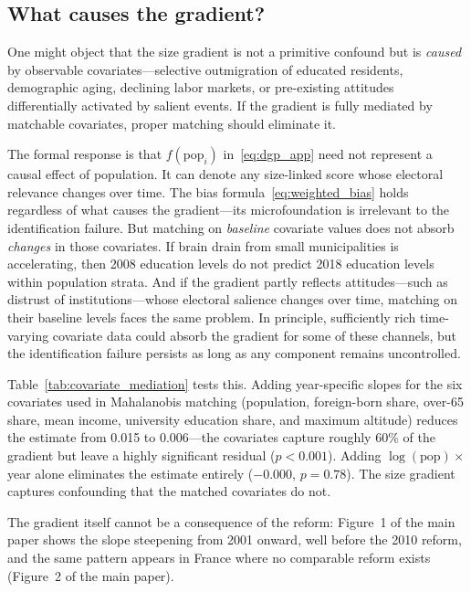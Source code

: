 \documentclass[12pt,letterpaper]{article}
\begin{document}
\subsection{What causes the gradient?}
\label{si:mediation}

One might object that the size gradient is not a primitive confound but is \textit{caused} by observable covariates---selective outmigration of educated residents, demographic aging, declining labor markets, or pre-existing attitudes differentially activated by salient events. If the gradient is fully mediated by matchable covariates, proper matching should eliminate it.

The formal response is that $f(\text{pop}_i)$ in~\eqref{eq:dgp_app} need not represent a causal effect of population. It can denote any size-linked score whose electoral relevance changes over time. The bias formula~\eqref{eq:weighted_bias} holds regardless of what causes the gradient---its microfoundation is irrelevant to the identification failure. But matching on \textit{baseline} covariate values does not absorb \textit{changes} in those covariates. If brain drain from small municipalities is accelerating, then 2008 education levels do not predict 2018 education levels within population strata. And if the gradient partly reflects attitudes---such as distrust of institutions---whose electoral salience changes over time, matching on their baseline levels faces the same problem. In principle, sufficiently rich time-varying covariate data could absorb the gradient for some of these channels, but the identification failure persists as long as any component remains uncontrolled.

Table~\ref{tab:covariate_mediation} tests this. Adding year-specific slopes for the six covariates used in Mahalanobis matching (population, foreign-born share, over-65 share, mean income, university education share, and maximum altitude) reduces the estimate from 0.015 to 0.006---the covariates capture roughly 60\% of the gradient but leave a highly significant residual ($p < 0.001$). Adding $\log(\text{pop}) \times$ year alone eliminates the estimate entirely ($-$0.000, $p = 0.78$). The size gradient captures confounding that the matched covariates do not.



The gradient itself cannot be a consequence of the reform: Figure~1 of the main paper shows the slope steepening from 2001 onward, well before the 2010 reform, and the same pattern appears in France where no comparable reform exists (Figure~2 of the main paper).



\end{document}
